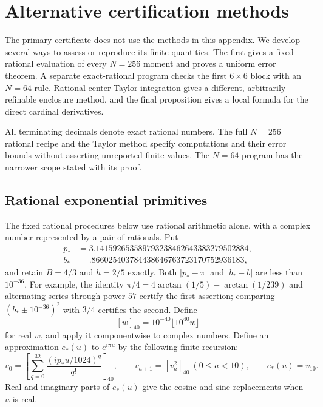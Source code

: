 \section{Alternative certification methods}\label{ind:section}

The primary certificate does not use the methods in this appendix.
We develop several ways to assess or reproduce its finite quantities.
The first gives a fixed rational evaluation of every $N=256$ moment and
proves a uniform error theorem.  A separate exact-rational
program checks the first $6\times6$ block with an $N=64$ rule.
Rational-center Taylor integration gives a different, arbitrarily refinable
enclosure method, and the final proposition gives a local formula for the
direct cardinal derivatives.

All terminating decimals denote exact rational numbers.  The full
$N=256$ rational recipe and the Taylor method specify computations and
their error bounds without asserting unreported finite values.  The
$N=64$ program has the narrower scope stated with its proof.

\subsection{Rational exponential primitives}\label{cert:rational-primitives}

The fixed rational procedures below use rational arithmetic alone, with a
complex number represented by a pair of rationals.  Put
\[
 \begin{aligned}
 p_*&=3.141592653589793238462643383279502884,\\
 b_*&=.866025403784438646763723170752936183,
 \end{aligned}
\]
and retain $B=4/3$ and $h=2/5$ exactly.  Both $|p_*-\pi|$ and $|b_*-b|$
are less than $10^{-36}$.  For example, the identity
$\pi/4=4\arctan(1/5)-\arctan(1/239)$ and alternating series through
power $57$ certify the first assertion; comparing $(b_*\pm10^{-36})^2$
with $3/4$ certifies the second.
Define
\[
 [w]_{40}=10^{-40}\lfloor10^{40}w\rfloor
\]
for real $w$, and apply it componentwise to complex numbers.  Define an
approximation $e_*(u)$ to $e^{i\pi u}$ by the following finite recursion:
\begin{equation}\label{cert:estar}
 v_0=\left[\sum_{q=0}^{32}\frac{(ip_*u/1024)^q}{q!}\right]_{40},
 \qquad v_{a+1}=[v_a^2]_{40}\ (0\le a<10),\qquad e_*(u)=v_{10}.
\end{equation}
Real and imaginary parts of $e_*(u)$ give the cosine and sine
replacements when $u$ is real.

